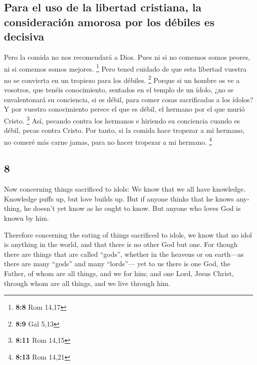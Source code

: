 \begin{paracol}{2}
\hypertarget{para-el-uso-de-la-libertad-cristiana-la-consideraciuxf3n-amorosa-por-los-duxe9biles-es-decisiva}{%
\subsection{Para el uso de la libertad cristiana, la consideración
amorosa por los débiles es
decisiva}\label{para-el-uso-de-la-libertad-cristiana-la-consideraciuxf3n-amorosa-por-los-duxe9biles-es-decisiva}}

 Pero la comida no nos recomendará a Dios. Pues ni si no
comemos somos peores, ni si comemos somos mejores. \footnote{\textbf{8:8}
  Rom 14,17}  Pero tened cuidado de que esta libertad
vuestra no se convierta en un tropiezo para los débiles. \footnote{\textbf{8:9}
  Gal 5,13}  Porque si un hombre os ve a vosotros, que
tenéis conocimiento, sentados en el templo de un ídolo, ¿no se
envalentonará su conciencia, si es débil, para comer cosas sacrificadas
a los ídolos?  Y por vuestro conocimiento perece el que
es débil, el hermano por el que murió Cristo. \footnote{\textbf{8:11}
  Rom 14,15}  Así, pecando contra los hermanos e hiriendo
su conciencia cuando es débil, pecas contra Cristo.  Por
tanto, si la comida hace tropezar a mi hermano, no comeré más carne
jamas, para no hacer tropezar a mi hermano. \footnote{\textbf{8:13} Rom
  14,21}

\switchcolumn
\begin{otherlanguage}{english}

\hypertarget{section-15}{%
\section{8}\label{section-15}}

 Now concerning things sacrificed to idols: We know that
we all have knowledge. Knowledge puffs up, but love builds up.
 But if anyone thinks that he knows anything, he doesn't
yet know as he ought to know.  But anyone who loves God is
known by him.

 Therefore concerning the eating of things sacrificed to
idols, we know that no idol is anything in the world, and that there is
no other God but one.  For though there are things that
are called ``gods'', whether in the heavens or on earth---as there are
many ``gods'' and many ``lords''---  yet to us there is
one God, the Father, of whom are all things, and we for him; and one
Lord, Jesus Christ, through whom are all things, and we live through
him.


\end{otherlanguage}
\end{paracol}
